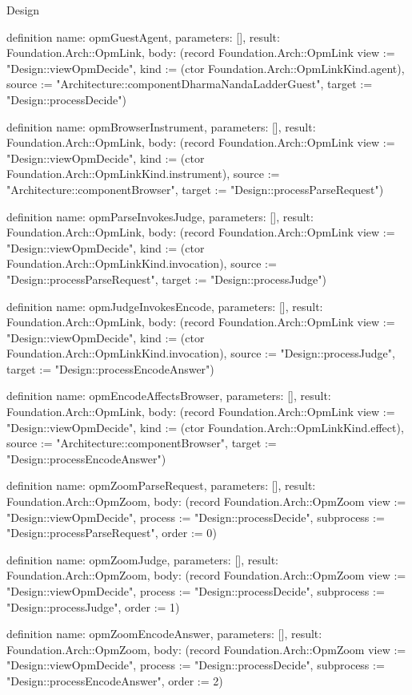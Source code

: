 \begin{lexlean}{Design}
\begin{semanticmodule}
definition{
  name: opmGuestAgent,
  parameters: [],
  result: Foundation.Arch::OpmLink,
  body: (record Foundation.Arch::OpmLink {view := "Design::viewOpmDecide", kind := (ctor Foundation.Arch::OpmLinkKind.agent), source := "Architecture::componentDharmaNandaLadderGuest", target := "Design::processDecide"})
}

definition{
  name: opmBrowserInstrument,
  parameters: [],
  result: Foundation.Arch::OpmLink,
  body: (record Foundation.Arch::OpmLink {view := "Design::viewOpmDecide", kind := (ctor Foundation.Arch::OpmLinkKind.instrument), source := "Architecture::componentBrowser", target := "Design::processParseRequest"})
}

definition{
  name: opmParseInvokesJudge,
  parameters: [],
  result: Foundation.Arch::OpmLink,
  body: (record Foundation.Arch::OpmLink {view := "Design::viewOpmDecide", kind := (ctor Foundation.Arch::OpmLinkKind.invocation), source := "Design::processParseRequest", target := "Design::processJudge"})
}

definition{
  name: opmJudgeInvokesEncode,
  parameters: [],
  result: Foundation.Arch::OpmLink,
  body: (record Foundation.Arch::OpmLink {view := "Design::viewOpmDecide", kind := (ctor Foundation.Arch::OpmLinkKind.invocation), source := "Design::processJudge", target := "Design::processEncodeAnswer"})
}

definition{
  name: opmEncodeAffectsBrowser,
  parameters: [],
  result: Foundation.Arch::OpmLink,
  body: (record Foundation.Arch::OpmLink {view := "Design::viewOpmDecide", kind := (ctor Foundation.Arch::OpmLinkKind.effect), source := "Architecture::componentBrowser", target := "Design::processEncodeAnswer"})
}

definition{
  name: opmZoomParseRequest,
  parameters: [],
  result: Foundation.Arch::OpmZoom,
  body: (record Foundation.Arch::OpmZoom {view := "Design::viewOpmDecide", process := "Design::processDecide", subprocess := "Design::processParseRequest", order := 0})
}

definition{
  name: opmZoomJudge,
  parameters: [],
  result: Foundation.Arch::OpmZoom,
  body: (record Foundation.Arch::OpmZoom {view := "Design::viewOpmDecide", process := "Design::processDecide", subprocess := "Design::processJudge", order := 1})
}

definition{
  name: opmZoomEncodeAnswer,
  parameters: [],
  result: Foundation.Arch::OpmZoom,
  body: (record Foundation.Arch::OpmZoom {view := "Design::viewOpmDecide", process := "Design::processDecide", subprocess := "Design::processEncodeAnswer", order := 2})
}


\end{semanticmodule}
\end{lexlean}
